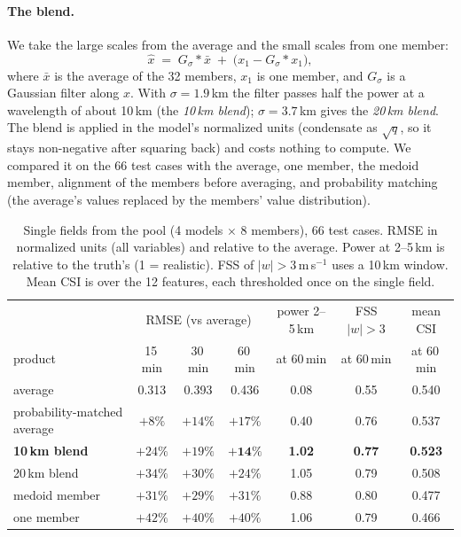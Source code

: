 \documentclass[11pt]{article}
\begin{document}
\paragraph{The blend.} We take the large scales from the average and the small scales from one member:
\[
\hat{x} \;=\; G_\sigma * \bar{x} \;+\; \bigl(x_1 - G_\sigma * x_1\bigr),
\]
where $\bar{x}$ is the average of the 32 members, $x_1$ is one member, and $G_\sigma$ is a Gaussian filter along $x$. With $\sigma = 1.9$\,km the filter passes half the power at a wavelength of about 10\,km (the \emph{10\,km blend}); $\sigma = 3.7$\,km gives the \emph{20\,km blend}. The blend is applied in the model's normalized units (condensate as $\sqrt{q}$, so it stays non-negative after squaring back) and costs nothing to compute. We compared it on the 66 test cases with the average, one member, the medoid member, alignment of the members before averaging, and probability matching (the average's values replaced by the members' value distribution).

\begin{table}[h]
\centering\small
\begin{tabular}{lcccccc}
\toprule
 & \multicolumn{3}{c}{RMSE (vs average)} & power 2--5\,km & FSS $|w|>3$ & mean CSI \\
product & 15\,min & 30\,min & 60\,min & at 60\,min & at 60\,min & at 60\,min \\
\midrule
average & 0.313 & 0.393 & 0.436 & 0.08 & 0.55 & 0.540 \\
probability-matched average & $+8\%$ & $+14\%$ & $+17\%$ & 0.40 & 0.76 & 0.537 \\
\textbf{10\,km blend} & $+24\%$ & $+19\%$ & $\mathbf{+14\%}$ & \textbf{1.02} & \textbf{0.77} & \textbf{0.523} \\
20\,km blend & $+34\%$ & $+30\%$ & $+24\%$ & 1.05 & 0.79 & 0.508 \\
medoid member & $+31\%$ & $+29\%$ & $+31\%$ & 0.88 & 0.80 & 0.477 \\
one member & $+42\%$ & $+40\%$ & $+40\%$ & 1.06 & 0.79 & 0.466 \\
\bottomrule
\end{tabular}
\caption{Single fields from the pool (4 models $\times$ 8 members), 66 test cases. RMSE in normalized units (all variables) and relative to the average. Power at 2--5\,km is relative to the truth's (1 = realistic). FSS of $|w|>3$\,m\,s$^{-1}$ uses a 10\,km window. Mean CSI is over the 12 features, each thresholded once on the single field.}
\label{tab:blend}
\end{table}
\end{document}
